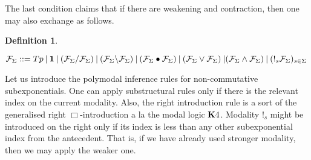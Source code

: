 \documentclass[a4paper]{article}
\theoremstyle{defin}
\newtheorem{defin}{Definition}
\theoremstyle{theorem}
\theoremstyle{prop}
\theoremstyle{lemma}
\theoremstyle{ex}
\theoremstyle{col}
\begin{document}
The last condition claims that if there are weakening and contraction, then one may also exchange as follows.

\begin{prooftree}
\end{prooftree}

\begin{defin}
$ $

  $\mathcal{F}_{\Sigma} ::= Tp \: | \: {\bf 1} \: | \: (\mathcal{F}_{\Sigma} / \mathcal{F}_{\Sigma}) \: | \: (\mathcal{F}_{\Sigma} \backslash
  \mathcal{F}_{\Sigma}) \: | \: (\mathcal{F}_{\Sigma} \bullet \mathcal{F}_{\Sigma}) \: | \: (\mathcal{F}_{\Sigma} \lor \mathcal{F}_{\Sigma}) \: | (\mathcal{F}_{\Sigma} \land \mathcal{F}_{\Sigma}) \: |
   \: ({!_s \mathcal{F}_{\Sigma}})_{s \in \Sigma} $
\end{defin}

Let us introduce the polymodal inference rules for non-commutative subexponentials. One can apply substructural
rules only if there is the relevant index on the current modality. Also, the right introduction rule is a sort of the
generalised right $\Box$-introduction a la the modal logic ${\bf K}4$. Modality $!_s$ might be introduced on the right only if its index is less than any other
subexponential index from the antecedent. That is, if we have already used stronger modality, then we may apply the weaker one.
\end{document}

